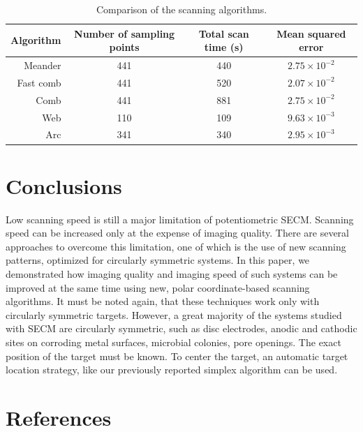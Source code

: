 \documentclass[3p]{elsarticle}
\begin{document}
\begin{table}
		\caption{Comparison of the scanning algorithms.}
		\label{table:comp}
		\centering
		\begin{tabular}{r c c c}
			Algorithm & Number of sampling points & Total scan time (s) & Mean squared error \\
			\hline
			Meander & 441 & 440 & $2.75\times 10^{-2}$ \\
			Fast comb & 441 & 520  & $2.07\times 10^{-2}$ \\
			Comb & 441 & 881 & $2.75\times 10^{-2}$ \\
			Web & 110 & 109 & $9.63\times 10^{-3}$ \\
			Arc & 341 & 340 & $2.95\times 10^{-3}$ \\

		\end{tabular}

\end{table}


\section{Conclusions}
Low scanning speed is still a major limitation of potentiometric SECM. Scanning speed can be increased only at the expense of imaging quality. There are several approaches to overcome this limitation, one of which is the use of new scanning patterns, optimized for circularly symmetric systems. In this paper, we demonstrated how imaging quality and imaging speed of such systems can be improved at the same time using new, polar coordinate-based scanning algorithms. It must be noted again, that these techniques work only with circularly symmetric targets. However, a great majority of the systems studied with SECM are circularly symmetric, such as disc electrodes, anodic and cathodic sites on corroding metal surfaces, microbial colonies, pore openings. The exact position of the target must be known. To center the target, an automatic target location strategy, like our previously reported simplex algorithm can be used. 

\section{References}
\end{document}
